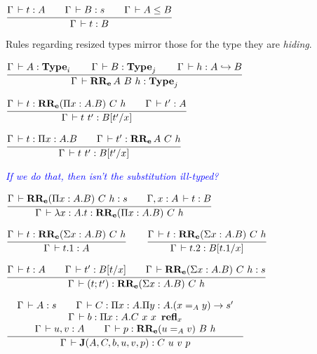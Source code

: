 \documentclass[a4paper,english]{lipics-utf8x}
\newcommand\meta[1]{\noindent\textcolor{blue}{\emph{#1}}}
\begin{document}
  \begin{center}
  \(
    \ru{\Gamma \der t : A \qquad
        \Gamma \der B : s \qquad
        \Gamma \der A \le B
      }{\Gamma \der t : B}
  \)
  \end{center}

  \noindent %
  Rules regarding resized types mirror those for the type they are
  \emph{hiding}.

  \begin{center}
  \(
    \ru{\Gamma \der A : \Type_i \qquad
        \Gamma \der B : \Type_j \qquad
        \Gamma \der h : \emb{A}{B}
      }{\Gamma \der \RRe{A}{B}{h} : \Type_j}
  \)
  \end{center}

  \begin{center}
  \(
    \ru{\Gamma \der t : \RRe{(\Pi x:A.B)}{C}{h} \qquad
        \Gamma \der t' : A
      }{\Gamma \der t\ t' : B[t'/x]}
  \)
  \end{center}

  \begin{center}
  \(
    \ru{\Gamma \der t : \Pi x:A.B \qquad
        \Gamma \der t' : \RRe{A}{C}{h}
      }{\Gamma \der t\ t' : B[t'/x]}
  \)
  \end{center}

  \meta{If we do that, then isn't the substitution ill-typed?}

  \begin{center}
  \(
    \ru{\Gamma \der \RRe{(\Pi x:A.B)}{C}{h} : s \qquad
        \Gamma, x:A \der t : B
      }{\Gamma \der \lambda x:A.t : \RRe{(\Pi x:A.B)}{C}{h}}
  \)
  \end{center}

  \begin{center}
  \(
    \ru{\Gamma \der t : \RRe{(\Sigma x:A.B)}{C}{h}
      }{\Gamma \der t.1 : A}
    \qquad
    \ru{\Gamma \der t : \RRe{(\Sigma x:A.B)}{C}{h}
      }{\Gamma \der t.2 : B[t.1/x]}
  \)
  \end{center}

  \begin{center}
  \(
    \ru{\Gamma \der t : A \qquad
        \Gamma \der t' : B[t/x] \qquad
        \Gamma \der \RRe{(\Sigma x:A.B)}{C}{h} : s
      }{\Gamma \der (t;t') : \RRe{(\Sigma x:A.B)}{C}{h}}
  \)
  \end{center}

  \begin{center}
  \(
    \tru{\Gamma \der A : s \qquad
         \Gamma \der C : \Pi x:A. \Pi y:A. (x =_A y) \to s'
       }{\Gamma \der b : \Pi x:A. C\ x\ x\ \refl_x
       }{\Gamma \der u, v : A \qquad
         \Gamma \der p : \RRe{(u =_A v)}{B}{h}
       }{\Gamma \der \J (A,C,b,u,v,p) : C\ u\ v\ p}
  \)
  \end{center}
\end{document}
